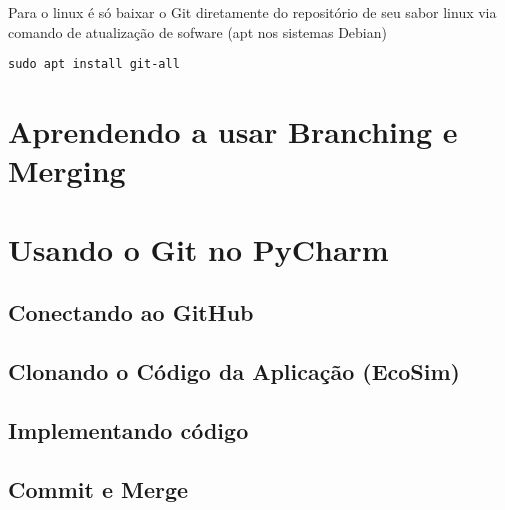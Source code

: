 \documentclass[12pt,a4paper]{article}
\begin{document}
Para o linux é só baixar o Git diretamente do repositório de seu sabor linux via comando de atualização de sofware (apt nos sistemas Debian)

\begin{verbatim}
sudo apt install git-all
\end{verbatim}



\section{Aprendendo a usar Branching e Merging}


\section{Usando o Git no PyCharm}


\subsection{Conectando ao GitHub}



\subsection{Clonando o Código da Aplicação (EcoSim)}


\subsection{Implementando código}


\subsection{Commit e Merge}



\end{document}
